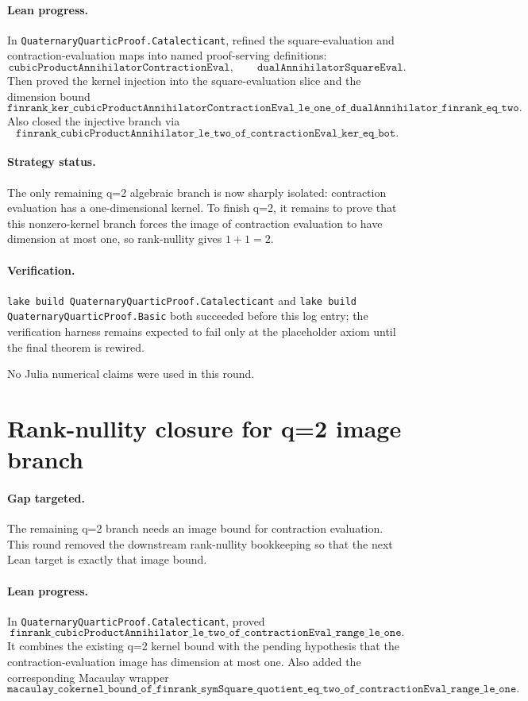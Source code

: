 \documentclass[11pt]{article}
\begin{document}
\paragraph{Lean progress.}
In \texttt{QuaternaryQuarticProof.Catalecticant}, refined the square-evaluation
and contraction-evaluation maps into named proof-serving definitions:
\[
\texttt{cubicProductAnnihilatorContractionEval},\qquad
\texttt{dualAnnihilatorSquareEval}.
\]
Then proved the kernel injection into the square-evaluation slice and the
dimension bound
\[
\texttt{finrank\_ker\_cubicProductAnnihilatorContractionEval\_le\_one\_of\_dualAnnihilator\_finrank\_eq\_two}.
\]
Also closed the injective branch via
\[
\texttt{finrank\_cubicProductAnnihilator\_le\_two\_of\_contractionEval\_ker\_eq\_bot}.
\]

\paragraph{Strategy status.}
The only remaining q=2 algebraic branch is now sharply isolated: contraction
evaluation has a one-dimensional kernel.  To finish q=2, it remains to prove
that this nonzero-kernel branch forces the image of contraction evaluation to
have dimension at most one, so rank-nullity gives \(1+1=2\).

\paragraph{Verification.}
\texttt{lake build QuaternaryQuarticProof.Catalecticant} and
\texttt{lake build QuaternaryQuarticProof.Basic} both succeeded before this
log entry; the verification harness remains expected to fail only at the
placeholder axiom until the final theorem is rewired.

No Julia numerical claims were used in this round.

\section*{Rank-nullity closure for q=2 image branch}

\paragraph{Gap targeted.}
The remaining q=2 branch needs an image bound for contraction evaluation.
This round removed the downstream rank-nullity bookkeeping so that the next
Lean target is exactly that image bound.

\paragraph{Lean progress.}
In \texttt{QuaternaryQuarticProof.Catalecticant}, proved
\[
\texttt{finrank\_cubicProductAnnihilator\_le\_two\_of\_contractionEval\_range\_le\_one}.
\]
It combines the existing q=2 kernel bound with the pending hypothesis that
the contraction-evaluation image has dimension at most one.  Also added the
corresponding Macaulay wrapper
\[
\texttt{macaulay\_cokernel\_bound\_of\_finrank\_symSquare\_quotient\_eq\_two\_of\_contractionEval\_range\_le\_one}.
\]
\end{document}

